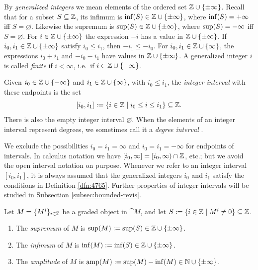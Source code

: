By {\em generalized integers}%
we mean elements of the ordered set 
$\mathbb{Z} \cup \{ \pm \infty \}$.  Recall that for a subset $S \subseteq \mathbb{Z}$, its 
infimum is $\operatorname{inf}(S) \in \mathbb{Z} \cup \{ \pm \infty \}$,
where $\operatorname{inf}(S) = + \infty$ iff $S = \varnothing$. 
Likewise the supremum is $\operatorname{sup}(S) \in \mathbb{Z} \cup \{ \pm \infty \}$,
where $\operatorname{sup}(S) = - \infty$ iff $S = \varnothing$.
For $i \in \mathbb{Z} \cup \{ \pm \infty \}$ 
the expression $-i$ has a value in $\mathbb{Z} \cup \{ \pm \infty \}$.
If $i_0, i_1 \in \mathbb{Z} \cup \{ \pm \infty \}$ satisfy 
$i_0 \leq i_1$, then $-i_1 \leq -i_0$. 
For $i_0, i_1 \in \mathbb{Z} \cup \{ \infty \}$, the expressions 
$i_0 + i_1$ and $-i_0 - i_1$ have values in 
$\mathbb{Z} \cup \{ \pm \infty \}$. 
A generalized integer $i$ is called {\em finite} if $i < \infty$,
i.e.\ if $i \in  \mathbb{Z} \cup \{ -\infty \}$. 

\begin{dfn} \label{dfn:4765}
Given $i_0 \in \mathbb{Z} \cup \{ -\infty \}$ and 
$i_1 \in \mathbb{Z} \cup \{ \infty \}$, with $i_0 \leq i_1$,
the {\em integer interval}%
with these endpoints is the set 
\[ [i_0, i_1] := \{ i \in \mathbb{Z}  \mid i_0 \leq i \leq i_1 \} \subseteq \mathbb{Z} . \]
There is also the empty integer interval $\varnothing$.
When the elements of an integer interval represent degrees, we 
sometimes call it a {\em degree interval}%
.
\end{dfn}

We exclude the possibilities $i_0 = i_1 = \infty$ and $i_0 = i_1 = -\infty$
for endpoints of intervals.
In calculus notation we have 
$[i_0, \infty] = [i_0, \infty) \cap \mathbb{Z}$, etc.; 
but we avoid the open interval notation on purpose. 
Whenever we refer to an integer interval $[i_0, i_1]$, it is always 
assumed that the generalized integers $i_0$ and $i_1$ satisfy the conditions in 
Definition \ref{dfn:4765}.
Further properties of integer intervals will be studied in Subsection 
\ref{subsec:bounded-revis}. 

\begin{dfn} \label{dfn:3155}
Let $M = \{ M^i \}_{i \in \mathbb{Z}}$ be a graded object in $\cat{M}$,
and let 
$S := \{ i \in \mathbb{Z} \mid  M^i \neq 0 \} \subseteq \mathbb{Z}$. 
\begin{enumerate}
\item The {\em supremum} of $M$ is
$\sup(M) := \operatorname{sup}(S) \in \mathbb{Z} \cup \{ \pm \infty \}$. 

\item The {\em infimum} of $M$ is 
$\inf(M) := \operatorname{inf}(S) \in \mathbb{Z} \cup \{ \pm \infty \}$. 

\item The {\em amplitude} of $M$ is 
$\operatorname{amp}(M) := \sup (M) - \inf (M) \in \mathbb{N} \cup \{ \pm \infty \}$.
\end{enumerate}
\end{dfn}

